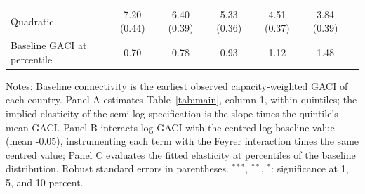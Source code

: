 \begin{table}[htbp]
\begin{threeparttable}
\begin{tabular}{lcccccc}
  Quadratic & 7.20 (0.44) & 6.40 (0.39) & 5.33 (0.36) & 4.51 (0.37) & 3.84 (0.39) & \\
  Baseline GACI at percentile & 0.70 & 0.78 & 0.93 & 1.12 & 1.48 & \\
\bottomrule
\end{tabular}
\begin{tablenotes}[flushleft]
\footnotesize
\item Notes: Baseline connectivity is the earliest observed capacity-weighted GACI of each country. Panel A estimates Table~\ref{tab:main}, column 1, within quintiles; the implied elasticity of the semi-log specification is the slope times the quintile's mean GACI. Panel B interacts log GACI with the centred log baseline value (mean -0.05), instrumenting each term with the Feyrer interaction times the same centred value; Panel C evaluates the fitted elasticity at percentiles of the baseline distribution. Robust standard errors in parentheses. $^{***}$, $^{**}$, $^{*}$: significance at 1, 5, and 10 percent.
\end{tablenotes}
\end{threeparttable}
\end{table}

